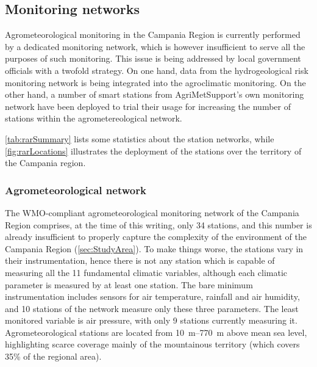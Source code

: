 \documentclass[authoryear,preprint,review,12pt]{elsarticle}
\begin{document}

\subsection{Monitoring networks}

Agrometeorological monitoring in the Campania Region is currently performed by a dedicated monitoring network, which is however insufficient to serve all the purposes of such monitoring. %
This issue is being addressed by local government officials with a twofold strategy.
On one hand, data from the hydrogeological risk monitoring network is being integrated into the agroclimatic monitoring. %
On the other hand, a number of smart stations from AgriMetSupport's own monitoring network have been deployed %
to trial their usage for increasing the number of stations within the agrometereological network.

\cref{tab:rarSummary} lists some statistics about the station networks, while \cref{fig:rarLocations} illustrates the deployment of the stations over the territory of the Campania region.

\subsubsection{Agrometeorological network\label{RARStructure}}

The WMO-compliant agrometeorological monitoring network of the Campania Region comprises, at the time of this writing, only 34 stations, and this number is already insufficient to properly capture the complexity of the environment of the Campania Region (\cref{sec:StudyArea}).
To make things worse, the stations vary in their instrumentation, hence there is not any station which is capable of measuring all the 11 fundamental climatic variables, although each climatic parameter is measured by at least one station.
The bare minimum instrumentation includes sensors for air temperature, rainfall and air humidity, and 10 stations of the network measure only these three parameters.
The least monitored variable is air pressure, with only 9 stations currently measuring it.
Agrometeorological stations are located from \SIrange{10}{770}{\metre} above mean sea level, highlighting scarce coverage mainly of the mountainous territory (which covers 35\% of the regional area).
\end{document}
